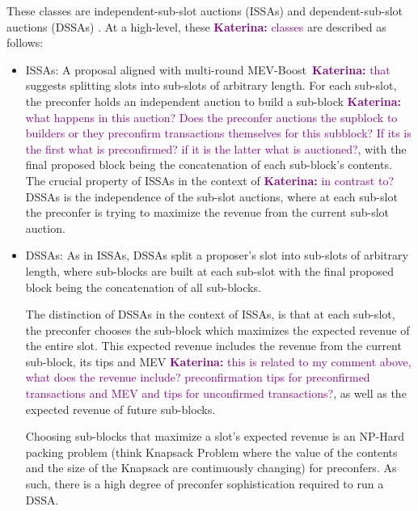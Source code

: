 \documentclass[a4paper]{article}
\theoremstyle{boldstyle}
\newcommand{\ks}[1]{\textcolor{purple}{\textbf{Katerina:} #1}}
\begin{document}
    These classes are independent-sub-slot auctions (ISSAs) \cite{W:EstimatingtheRevenuefromIndependentSub-SlotAuctionPreconfirmations} and dependent-sub-slot auctions (DSSAs) \cite{W:AnalysingExpectedProposerRevenuefromPreconfirmations}. At a high-level, these %
    \ks{classes } are described as follows:
    \begin{itemize}
        \item ISSAs: A proposal aligned with multi-round MEV-Boost~\cite{W:BasedPreconfirmationswithMulti-roundMEV-Boost}\ks{that} suggests splitting slots into sub-slots of arbitrary length. For each sub-slot, the preconfer holds an independent auction to build a sub-block \ks{what happens in this auction? Does the preconfer auctions the supblock to builders or they preconfirm transactions themselves for this subblock? If its is the first what is preconfirmed? if it is the latter what is auctioned?}, with the final proposed block being the concatenation of each sub-block's contents. The crucial property of ISSAs in the context of \ks{in contrast to?} DSSAs is the independence of the sub-slot auctions, where at each sub-slot the preconfer is trying to maximize the revenue from the current sub-slot auction. 
        
        \item DSSAs: As in ISSAs, DSSAs split a proposer's slot into sub-slots of arbitrary length, where sub-blocks are built at each sub-slot with the final proposed block being the concatenation of all sub-blocks. 
        
        The distinction of DSSAs in the context of ISSAs, is that at each sub-slot, the preconfer chooses the sub-block which maximizes the expected revenue of the entire slot. This expected revenue includes the revenue from the current sub-block, its tips and MEV \ks{this is related to my comment above, what does the revenue include? preconfirmation tips for preconfirmed transactions and MEV and tips for unconfirmed transactions?}, as well as the expected revenue of future sub-blocks.  

        Choosing sub-blocks that maximize a slot's expected revenue is an NP-Hard packing problem (think Knapsack Problem where the value of the contents and the size of the Knapsack are continuously changing) for preconfers. As such, there is a high degree of preconfer sophistication required to run a DSSA. 
    \end{itemize}
\end{document}
